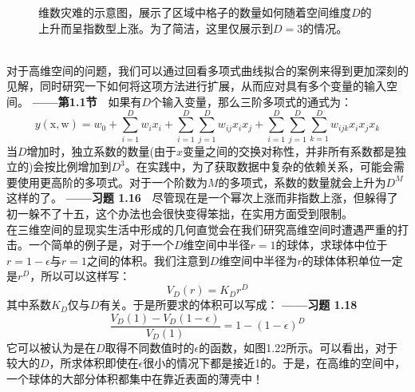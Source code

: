\documentclass[b5paper]{book}
\numberwithin{equation}{chapter}
\begin{document}
{\begin{figure}[ht]
\begin{minipage}[t]{0.3\linewidth}
		\label{fig:1-21c}
		\end{minipage}
		\caption{维数灾难的示意图，展示了区域中格子的数量如何随着空间维度$D$的上升而呈指数型上涨。为了简洁，这里仅展示到$D=3$的情况。}
	\end{figure}
	\\
	\indent 对于高维空间的问题，我们可以通过回看多项式曲线拟合的案例来得到更加深刻的见解，同时研究一下如何将这项方法进行扩展，从而应对具有多个变量的输入空间。\color{red} \textbf{——第1.1节}　\color{black}如果有$D$个输入变量，那么三阶多项式的通式为：
	\begin{equation}
		y(\boldsymbol{\mathrm{x}},\boldsymbol{\mathrm{w}})=w_0 + \sum_{i=1}^{D}{w_ix_i} + \sum_{i=1}^{D} \sum_{j=1}^{D}{w_{ij}x_ix_j} + \sum_{i=1}^{D}\sum_{j=1}^{D}\sum_{k=1}^{D}{w_{ijk}x_ix_jx_k}
	\end{equation}
	\indent 当$D$增加时，独立系数的数量(由于$x$变量之间的交换对称性，并非所有系数都是独立的)会按比例增加到$D^3$。在实践中，为了获取数据中复杂的依赖关系，可能会需要使用更高阶的多项式。对于一个阶数为$M$的多项式，系数的数量就会上升为$D^M$这样的了。\color{red} \textbf{——习题 1.16}　\color{black}尽管现在是一个幂次上涨而非指数上涨，但躲得了初一躲不了十五，这个办法也会很快变得笨拙，在实用方面受到限制。\\
	\indent 在三维空间的显现实生活中形成的几何直觉会在我们研究高维空间时遭遇严重的打击。一个简单的例子是，对于一个$D$维空间中半径$r=1$的球体，求球体中位于$r=1-\epsilon$与$r=1$之间的体积。我们注意到$D$维空间中半径为$r$的球体体积单位一定是$r^D$，所以可以这样写：
	\begin{equation}
		V_D(r)=K_Dr^D
	\end{equation}
	其中系数$K_D$仅与$D$有关。于是所要求的体积可以写成：\color{red} \textbf{——习题 1.18}　\color{black}
	\begin{equation}
		\frac{V_D(1)-V_D(1-\epsilon)}{V_D(1)}=1-(1-\epsilon)^D
	\end{equation}
	它可以被认为是在$D$取得不同数值时的$\epsilon$的函数，如图1.22所示。可以看出，对于较大的$D$，所求体积即使在$\epsilon$很小的情况下都是接近1的。于是，在高维的空间中，一个球体的大部分体积都集中在靠近表面的薄壳中！
	\begin{figure}[ht]
		\centering

\end{figure}}
\end{document}
